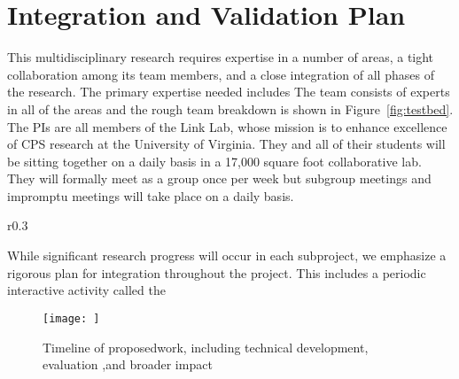 \section{Integration and Validation Plan}
This multidisciplinary research requires expertise in a number of areas, a tight collaboration among its team members, and a close integration of all phases of the research. The primary expertise needed includes  The team consists of experts in all of the areas and the rough team breakdown is shown in Figure~\ref{fig:testbed}. The PIs are all members of the Link Lab, whose mission is to enhance excellence of CPS research at the University of Virginia. They and all of their students will be sitting together on a daily basis in a 17,000 square foot collaborative lab. They will formally meet as a group once per week but subgroup meetings and impromptu meetings will take place on a daily basis.

\begin{wrapfigure}{r}{0.3\linewidth}
\end{wrapfigure}

While significant research progress will occur in each subproject, we emphasize a rigorous plan for integration throughout the project. This includes a periodic interactive activity called the


\begin{figure}
    \centering
    \texttt{[image: ]}
    \caption{Timeline of proposedwork, including technical development, evaluation ,and
  broader impact}
    \label{fig:timeline}
\end{figure}